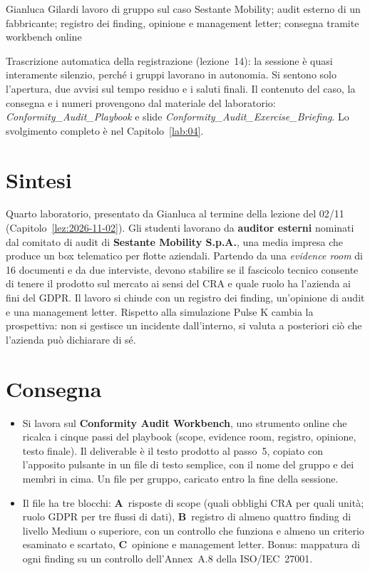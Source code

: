   {Gianluca Gilardi}
  {lavoro di gruppo sul caso Sestante Mobility; audit esterno di un fabbricante;
   registro dei finding, opinione e management letter; consegna tramite workbench online}
\label{lez:2026-11-06}

\begin{nota}[Fonte]
Trascrizione automatica della registrazione (lezione~14): la sessione è quasi interamente silenzio,
perché i gruppi lavorano in autonomia. Si sentono solo l'apertura, due avvisi sul tempo residuo e i
saluti finali. Il contenuto del caso, la consegna e i numeri provengono dal materiale del laboratorio:
\emph{Conformity\_Audit\_Playbook} e slide \emph{Conformity\_Audit\_Exercise\_Briefing}. Lo
svolgimento completo è nel Capitolo~\ref{lab:04}.
\end{nota}

\section{Sintesi}
Quarto laboratorio, presentato da Gianluca al termine della lezione del 02/11
(Capitolo~\ref{lez:2026-11-02}). Gli studenti lavorano da \textbf{auditor esterni} nominati dal
comitato di audit di \textbf{Sestante Mobility S.p.A.}, una media impresa che produce un box
telematico per flotte aziendali. Partendo da una \emph{evidence room} di 16 documenti e da due
interviste, devono stabilire se il fascicolo tecnico consente di tenere il prodotto sul mercato ai
sensi del CRA e quale ruolo ha l'azienda ai fini del GDPR. Il lavoro si chiude con un registro dei
finding, un'opinione di audit e una management letter. Rispetto alla simulazione Pulse K cambia la
prospettiva: non si gestisce un incidente dall'interno, si valuta a posteriori ciò che l'azienda può
dichiarare di sé.

\section{Consegna}
\begin{itemize}
  \item Si lavora sul \textbf{Conformity Audit Workbench}, uno strumento online che ricalca i cinque
    passi del playbook (scope, evidence room, registro, opinione, testo finale). Il deliverable è il
    testo prodotto al passo~5, copiato con l'apposito pulsante in un file di testo semplice, con il
    nome del gruppo e dei membri in cima. Un file per gruppo, caricato entro la fine della sessione.
  \item Il file ha tre blocchi: \textbf{A}~risposte di scope (quali obblighi CRA per quali unità;
    ruolo GDPR per tre flussi di dati), \textbf{B}~registro di almeno quattro finding di livello
    Medium o superiore, con un controllo che funziona e almeno un criterio esaminato e scartato,
    \textbf{C}~opinione e management letter. Bonus: mappatura di ogni finding su un controllo
    dell'Annex~A.8 della ISO/IEC~27001.
\end{itemize}


